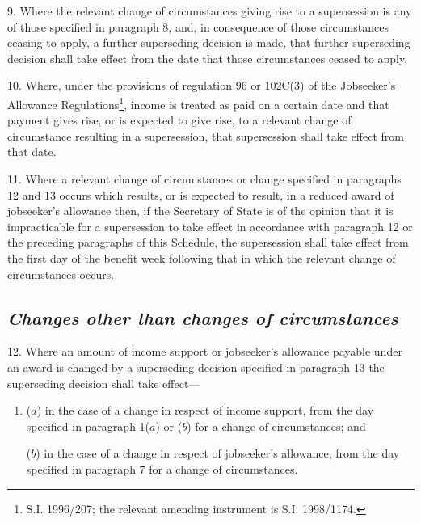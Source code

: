 \documentclass[12pt,a4paper]{article}
\begin{document}
\medskip

9.  Where the relevant change of circumstances giving rise to a supersession is any of those specified in paragraph 8, and, in consequence of those circumstances ceasing to apply, a further superseding decision is made, that further superseding decision shall take effect from the date that those circumstances ceased to apply.

\medskip

10.  Where, under the provisions of regulation 96 or 102C(3) of the Jobseeker’s Allowance Regulations\footnote{\frenchspacing S.I. 1996/207; the relevant amending instrument is S.I. 1998/1174.}, income is treated as paid on a certain date and that payment gives rise, or is expected to give rise, to a relevant change of circumstance resulting in a supersession, that supersession shall take effect from that date.

\medskip

11.  Where a relevant change of circumstances 
or change specified in paragraphs 12 and 13  %
occurs which results, or is expected to result, in a reduced award of jobseeker’s allowance then, if the Secretary of State is of the opinion that it is impracticable for a supersession to take effect in accordance with 
paragraph 12 or %
the preceding paragraphs of this Schedule, the supersession shall take effect from the first day of the benefit week following that in which the relevant change of circumstances occurs.


\subsection*{\sloppy\itshape Changes other than changes of circumstances}

12.  Where an amount of income support or jobseeker’s allowance payable under an award is changed by a superseding decision specified in paragraph 13 the superseding decision shall take effect—
\begin{enumerate}\item[]
($a$) in the case of a change in respect of income support, from the day specified in paragraph 1($a$)  or ($b$)  for a change of circumstances; and

($b$) in the case of a change in respect of jobseeker’s allowance, from the day specified in paragraph 7 for a change of circumstances.
\end{enumerate}
\end{document}

